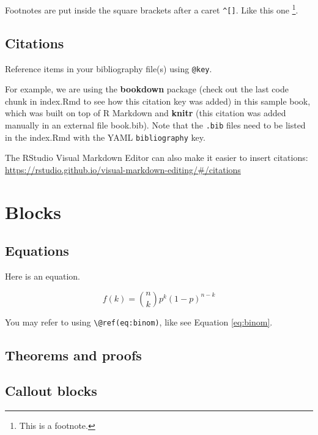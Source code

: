 \documentclass[
]{book}
\begin{document}
Footnotes are put inside the square brackets after a caret \texttt{\^{}{[}{]}}. Like this one \footnote{This is a footnote.}.

\hypertarget{citations}{%
\section{Citations}\label{citations}}

Reference items in your bibliography file(s) using \texttt{@key}.

For example, we are using the \textbf{bookdown} package \citep{R-bookdown} (check out the last code chunk in index.Rmd to see how this citation key was added) in this sample book, which was built on top of R Markdown and \textbf{knitr} \citep{xie2015} (this citation was added manually in an external file book.bib).
Note that the \texttt{.bib} files need to be listed in the index.Rmd with the YAML \texttt{bibliography} key.

The RStudio Visual Markdown Editor can also make it easier to insert citations: \url{https://rstudio.github.io/visual-markdown-editing/\#/citations}

\hypertarget{blocks}{%
\chapter{Blocks}\label{blocks}}

\hypertarget{equations}{%
\section{Equations}\label{equations}}

Here is an equation.

\begin{equation} 
  f\left(k\right) = \binom{n}{k} p^k\left(1-p\right)^{n-k}
  \label{eq:binom}
\end{equation}

You may refer to using \texttt{\textbackslash{}@ref(eq:binom)}, like see Equation \eqref{eq:binom}.

\hypertarget{theorems-and-proofs}{%
\section{Theorems and proofs}\label{theorems-and-proofs}}

\hypertarget{callout-blocks}{%
\section{Callout blocks}\label{callout-blocks}}
\end{document}
